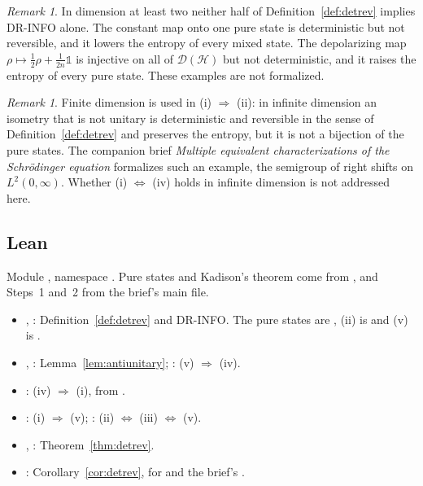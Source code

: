 \documentclass[11pt]{article}
\theoremstyle{definition}
\theoremstyle{remark}
\newtheorem{remark}[theorem]{Remark}
\begin{document}
\begin{remark}
  In dimension at least two neither half of Definition~\ref{def:detrev} implies DR-INFO alone.
  The constant map onto one pure state is deterministic but not reversible, and it lowers the
  entropy of every mixed state. The depolarizing map $\rho\mapsto\frac12\rho +
  \frac1{2n}\mathbb 1$ is injective on all of $\mathcal D(\mathcal H)$ but not deterministic,
  and it raises the entropy of every pure state. These examples are not formalized.
\end{remark}

\begin{remark}
  Finite dimension is used in (i) $\Rightarrow$ (ii): in infinite dimension an isometry that is
  not unitary is deterministic and reversible in the sense of Definition~\ref{def:detrev} and
  preserves the entropy, but it is not a bijection of the pure states. The companion brief
  \emph{Multiple equivalent characterizations of the Schr\"odinger equation} formalizes such an
  example, the semigroup of right shifts on $L^2(0, \infty)$. Whether (i) $\Leftrightarrow$
  (iv) holds in infinite dimension is not addressed here.
\end{remark}

\subsection{Lean}

Module , namespace
. Pure states and Kadison's theorem come from
, and Steps~1 and~2 from the brief's main file.

\begin{itemize}
  \item {}, : Definition~\ref{def:detrev} and DR-INFO.
    The pure states are , (ii) is
     and (v) is
    .
  \item {}, :
    Lemma~\ref{lem:antiunitary}; : (v) $\Rightarrow$ (iv).
  \item {}: (iv) $\Rightarrow$ (i), from
    .
  \item {}: (i)
    $\Rightarrow$ (v); : (ii) $\Leftrightarrow$
    (iii) $\Leftrightarrow$ (v).
  \item {}, : Theorem~\ref{thm:detrev}.
  \item {}: Corollary~\ref{cor:detrev}, for
     and the brief's
    .
\end{itemize}
\end{document}
